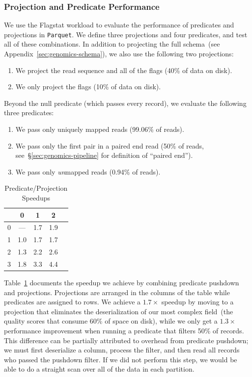 \documentclass{sig-alternate}
\begin{document}
\subsubsection{Projection and Predicate Performance}
\label{sec:projection-predicate-performance}

We use the Flagstat workload to evaluate the performance of predicates and projections in \texttt{Parquet}.
We define three projections and four predicates, and test all of these combinations. In addition to projecting the
full schema~(see Appendix~\ref{sec:genomics-schema}), we also use the following two projections:

\begin{enumerate}
\item We project the read sequence and all of the flags (40\% of data on disk).
\item We only project the flags (10\% of data on disk).
\end{enumerate}

Beyond the null predicate (which passes every record), we evaluate the following three predicates:

\begin{enumerate}
\item We pass only uniquely mapped reads (99.06\% of reads).
\item We pass only the first pair in a paired end read (50\% of reads, see~\S\ref{sec:genomics-pipeline} for definition of
``paired end'').
\item We pass only \emph{un}mapped reads (0.94\% of reads).
\end{enumerate}

\begin{table}[h]
\caption{Predicate/Projection Speedups}
\label{tab:ppp}
\begin{center}
\begin{tabular}{ l | c c c c }
\hline
& 0 & 1 & 2 \\
\hline
\hline
0 & --- & 1.7 & 1.9 \\
1 & 1.0 & 1.7 & 1.7 \\
2 & 1.3 & 2.2 & 2.6 \\
3 & 1.8 & 3.3 & 4.4 \\
\hline
\end{tabular}
\end{center}
\end{table}

Table~\ref{tab:ppp} documents the speedup we achieve by combining predicate pushdown and projections. Projections
are arranged in the columns of the table while predicates are assigned to rows. We achieve a $1.7\times$ speedup by
moving to a projection that eliminates the deserialization of our most complex field~(the quality scores that consume
60\% of space on disk), while we only get a $1.3\times$ performance improvement when running a predicate that
filters 50\% of records. This difference can be partially attributed to overhead from predicate pushdown; we must first
deserialize a column, process the filter, and then read all records who passed the pushdown filter. If we did not perform
this step, we would be able to do a straight scan over all of the data in each partition.
\end{document}
